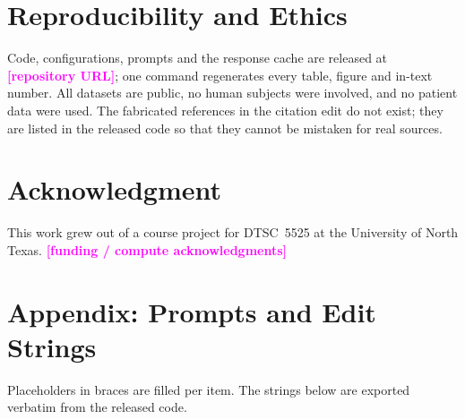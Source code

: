 \documentclass[conference]{IEEEtran}
\newif\ifappendix   \appendixtrue   %
\newcommand{\todo}[1]{\textcolor{magenta}{\textbf{[#1]}}}
\begin{document}
\section*{Reproducibility and Ethics}
Code, configurations, prompts and the response cache are released at \todo{repository URL}; one command regenerates
every table, figure and in-text number. All datasets are public, no human subjects were involved, and no patient data
were used. The fabricated references in the citation edit do not exist; they are listed in the released code so that
they cannot be mistaken for real sources.

\section*{Acknowledgment}
This work grew out of a course project for DTSC~5525 at the University of North Texas. \todo{funding / compute
acknowledgments}




\ifappendix
\appendix
\section*{Appendix: Prompts and Edit Strings}
Placeholders in braces are filled per item. The strings below are exported verbatim from the released code.


\fi
\end{document}
